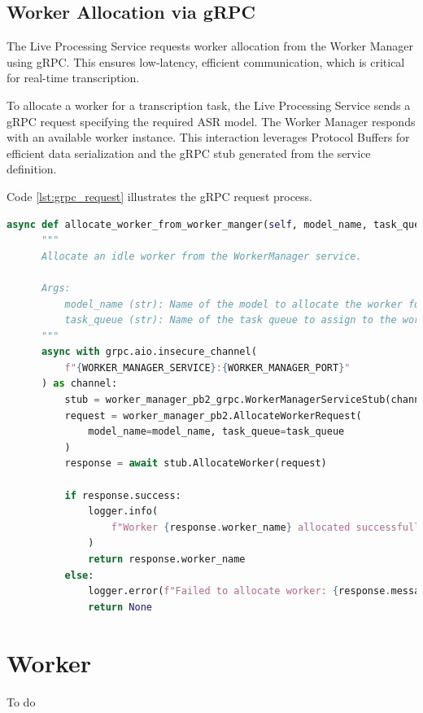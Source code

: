 \subsection{Worker Allocation via gRPC}
The Live Processing Service requests worker allocation from the Worker Manager using gRPC. This ensures low-latency, efficient communication, which is critical for real-time transcription.

To allocate a worker for a transcription task, the Live Processing Service sends a gRPC request specifying the required ASR model. The Worker Manager responds with an available worker instance. This interaction leverages Protocol Buffers for efficient data serialization and the gRPC stub generated from the service definition.

Code \ref{lst:grpc_request} illustrates the gRPC request process.

\begin{lstlisting}[language=python, caption={gRPC Request for Worker Allocation}, label={lst:grpc_request}]
async def allocate_worker_from_worker_manger(self, model_name, task_queue):
      """
      Allocate an idle worker from the WorkerManager service.

      Args:
          model_name (str): Name of the model to allocate the worker for.
          task_queue (str): Name of the task queue to assign to the worker.
      """
      async with grpc.aio.insecure_channel(
          f"{WORKER_MANAGER_SERVICE}:{WORKER_MANAGER_PORT}"
      ) as channel:
          stub = worker_manager_pb2_grpc.WorkerManagerServiceStub(channel)
          request = worker_manager_pb2.AllocateWorkerRequest(
              model_name=model_name, task_queue=task_queue
          )
          response = await stub.AllocateWorker(request)

          if response.success:
              logger.info(
                  f"Worker {response.worker_name} allocated successfully: {response.message}"
              )
              return response.worker_name
          else:
              logger.error(f"Failed to allocate worker: {response.message}")
              return None
\end{lstlisting}


\section{Worker}
To do

